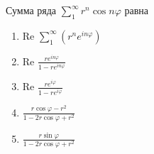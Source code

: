 Сумма ряда \(\sum_{1}^{\infty } r^n\cos n\varphi\) равна

\begin{enumerate}[label=\arabic*)]
    \item Re \(\sum_{1}^{\infty } \left(r^ne^{in\varphi }\right)\)
    \item Re \(\frac{re^{in\varphi }}{1-re^{in\varphi }}\)
    \item Re \(\frac{re^{i\varphi }}{1-re^{i\varphi }}\)
    \item \(\frac{r\cos \varphi -r^2}{1-2r\cos \varphi +r^2}\)
    \item \(\frac{r\sin \varphi }{1-2r\cos \varphi +r^2}\)
\end{enumerate}

